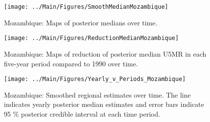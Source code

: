 \documentclass[12pt]{article}\usepackage[]{graphicx}\usepackage[]{color}
\newenvironment{knitrout}{}{} %
\begin{document}
\begin{knitrout}
\color{fgcolor}\begin{figure}[bht]

{\centering \texttt{[image: ../Main/Figures/SmoothMedianMozambique]} 

}

\caption[Mozambique]{Mozambique: Maps of posterior medians over time.}\label{fig:unnamed-chunk-234}
\end{figure}


\end{knitrout}
\begin{knitrout}
\color{fgcolor}\begin{figure}[bht]

{\centering \texttt{[image: ../Main/Figures/ReductionMedianMozambique]} 

}

\caption[Mozambique]{Mozambique: Maps of reduction of posterior median U5MR in each five-year period compared to 1990 over time.}\label{fig:unnamed-chunk-235}
\end{figure}


\end{knitrout}
\begin{knitrout}
\color{fgcolor}\begin{figure}[bht]

{\centering \texttt{[image: ../Main/Figures/Yearly\_v\_Periods\_Mozambique]} 

}

\caption[Mozambique]{Mozambique: Smoothed regional estimates over time. The line indicates yearly posterior median estimates and error bars indicate 95 \% posterior credible interval at each time period.}\label{fig:unnamed-chunk-236}
\end{figure}


\end{knitrout}
\end{document}
